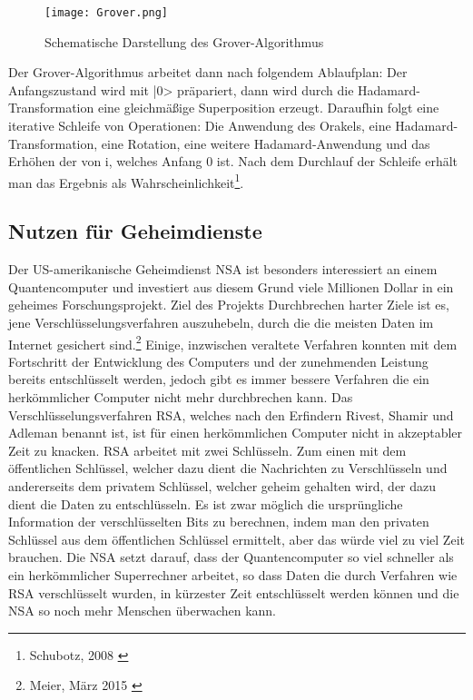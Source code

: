 \documentclass[12pt]{report}
\begin{document}
\begin{figure}[h]
\centering
	\texttt{[image: Grover.png]}
 	 \caption{
 	 Schematische Darstellung des Grover-Algorithmus
 	 }
 
\end{figure}

Der Grover-Algorithmus arbeitet dann nach folgendem Ablaufplan: Der Anfangszustand wird mit |0> präpariert, dann wird durch die Hadamard-Transformation eine gleichmäßige Superposition erzeugt. Daraufhin folgt eine iterative Schleife von Operationen: Die Anwendung des Orakels, eine Hadamard-Transformation, eine Rotation, eine weitere Hadamard-Anwendung und das Erhöhen der von i, welches Anfang 0 ist. Nach dem Durchlauf der Schleife erhält man das Ergebnis als Wahrscheinlichkeit\footnote{Schubotz, 2008 \cite{j341-3}}.


 \subsection{Nutzen für Geheimdienste}

Der US-amerikanische Geheimdienst NSA ist besonders interessiert an einem Quantencomputer und investiert aus diesem Grund viele Millionen Dollar in ein geheimes Forschungsprojekt. Ziel des Projekts \glqq Durchbrechen harter Ziele\grqq{}  ist es, jene Verschlüsselungsverfahren auszuhebeln, durch die die meisten Daten im Internet gesichert sind.\footnote{Meier, März 2015 \cite{j33-1}} Einige, inzwischen veraltete Verfahren konnten mit dem Fortschritt der Entwicklung des Computers und der zunehmenden Leistung bereits entschlüsselt werden, jedoch gibt es immer bessere Verfahren die ein herkömmlicher Computer nicht mehr durchbrechen kann. Das Verschlüsselungsverfahren RSA, welches nach den Erfindern Rivest, Shamir und Adleman benannt ist, ist für einen herkömmlichen Computer nicht in akzeptabler Zeit zu knacken. RSA arbeitet mit zwei Schlüsseln. Zum einen mit dem öffentlichen Schlüssel, welcher dazu dient die Nachrichten zu Verschlüsseln und andererseits  dem privatem Schlüssel, welcher geheim gehalten wird, der dazu dient die Daten zu entschlüsseln. Es ist zwar möglich die ursprüngliche Information der verschlüsselten Bits zu berechnen, indem man den privaten Schlüssel aus dem öffentlichen Schlüssel ermittelt, aber das würde viel zu viel Zeit brauchen.
Die NSA setzt darauf, dass der Quantencomputer so viel schneller als ein herkömmlicher Superrechner arbeitet, so dass Daten die durch Verfahren wie RSA verschlüsselt wurden, in kürzester Zeit entschlüsselt werden können und die NSA so noch mehr Menschen überwachen kann. 
\newpage
\end{document}
